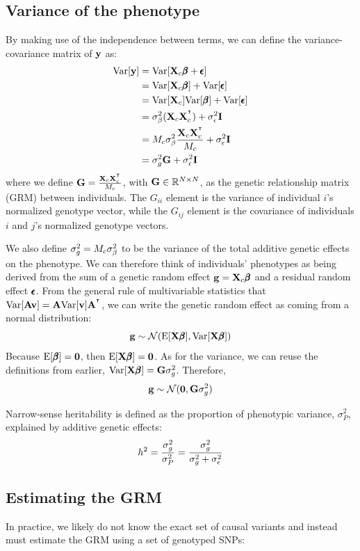 \documentclass[12pt]{article}
\begin{document}
\subsection{Variance of the phenotype}
By making use of the independence between terms, we can define the variance-covariance matrix of $\mathbf{y}$ as:
\begin{align*}
    \mathrm{Var}[\mathbf{y}] &= \mathrm{Var}[\mathbf{X}_c \pmb{\beta} + \pmb{\epsilon}] \\
    &= \mathrm{Var}[\mathbf{X}_c \pmb{\beta}] + \mathrm{Var}[\pmb{\epsilon}] \\
    &= \mathrm{Var}[\mathbf{X}_c] \mathrm{Var}[\pmb{\beta}] + \mathrm{Var}[\pmb{\epsilon}] \\
    &= \sigma_{\beta}^2 (\mathbf{X}_c \mathbf{X}_c^{^\intercal}) + \sigma_{\epsilon}^2 \mathbf{I}  \\
    &= M_c \sigma_{\beta}^2 \frac{\mathbf{X}_c \mathbf{X}_c^{^\intercal}}{M_c}  + \sigma_{\epsilon}^2 \mathbf{I}  \\
    &= \sigma_g^2 \mathbf{G} + \sigma_{\epsilon}^2 \mathbf{I} \\
\end{align*}
where we define $\mathbf{G} = \frac{\mathbf{X}_c \mathbf{X}_c^{^\intercal}}{M_c}$, with $\mathbf{G} \in \mathbb{R}^{N \times N}$, as the genetic relationship matrix (GRM) between individuals.
The $G_{ii}$ element is the variance of individual $i$'s normalized genotype vector, while the $G_{ij}$ element is the covariance of individuals $i$ and $j$'s normalized genotype vectors.

We also define $\sigma_g^2 = M_c \sigma_{\beta}^2$ to be the variance of the total additive genetic effects on the phenotype. We can therefore think of individuals' phenotypes as being derived from the sum of a genetic random effect $\mathbf{g} = \mathbf{X}_c \pmb{\beta}$ and a residual random effect $\pmb{\epsilon}$. From the general rule of multivariable statistics that $\mathrm{Var}[\mathbf{A} \mathbf{v}] = \mathbf{A} \mathrm{Var}[\mathbf{v}] \mathbf{A}^{^\intercal}$, we can write the genetic random effect as coming from a normal distribution:
$$ \mathbf{g} \sim \mathcal{N}(\mathrm{E}[\mathbf{X} \pmb{\beta}], \mathrm{Var}[\mathbf{X} \pmb{\beta}]) $$
Because $\mathrm{E}[\pmb{\beta}] = \textbf{0}$, then $\mathrm{E}[\mathbf{X} \pmb{\beta}] = \textbf{0}$. As for the variance, we can reuse the definitions from earlier, $\mathrm{Var}[\mathbf{X} \pmb{\beta}] =  \mathbf{G} \sigma_g^2$. Therefore,
$$ \mathbf{g} \sim \mathcal{N}(\textbf{0}, \mathbf{G} \sigma_g^2) $$

Narrow-sense heritability is defined as the proportion of phenotypic variance, $\sigma_P^2$, explained by additive genetic effects:
$$ h^2 = \frac{\sigma_g^2}{\sigma_P^2} = \frac{\sigma_g^2}{\sigma_g^2 + \sigma_{\epsilon}^2} $$

\subsection{Estimating the GRM}

In practice, we likely do not know the exact set of causal variants and instead must estimate the GRM using a set of genotyped SNPs:
\end{document}
